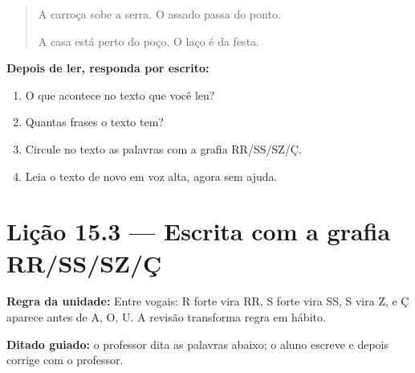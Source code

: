 \begin{quote}
A carroça sobe a serra. O assado passa do ponto.

A casa está perto do poço. O laço é da festa.
\end{quote}

\textbf{Depois de ler, responda por escrito:}
\begin{enumerate}

  \item O que acontece no texto que você leu?
  \begin{center}
  \underline{\hspace{12cm}}
  \end{center}

  \item Quantas frases o texto tem?
  \begin{center}
  \underline{\hspace{12cm}}
  \end{center}

  \item Circule no texto as palavras com a grafia RR/SS/SZ/Ç.

  \item Leia o texto de novo em voz alta, agora sem ajuda.

\end{enumerate}

\section{Lição 15.3 --- Escrita com a grafia RR/SS/SZ/Ç}

\noindent\textbf{Regra da unidade:} Entre vogais: R forte vira RR, S forte vira SS, S vira Z, e Ç aparece antes de A, O, U. A revisão transforma regra em hábito.


\noindent\textbf{Ditado guiado:} o professor dita as palavras abaixo; o aluno escreve e depois corrige com o professor.

\begin{center}
  \underline{\hspace{2.3cm}} \quad \underline{\hspace{2.3cm}} \quad \underline{\hspace{2.3cm}} \quad \underline{\hspace{2.3cm}}

  \underline{\hspace{2.3cm}} \quad \underline{\hspace{2.3cm}} \quad \underline{\hspace{2.3cm}} \quad \underline{\hspace{2.3cm}}
\end{center}

